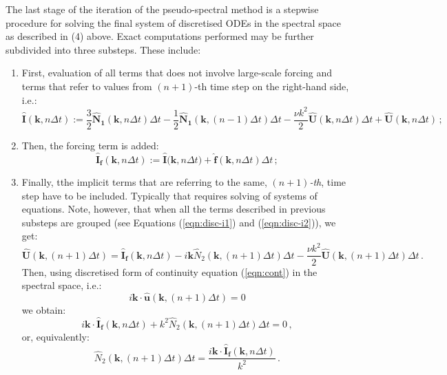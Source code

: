 \documentclass{pracamgren}
\begin{document}
The last stage of the iteration of the pseudo-spectral method is a stepwise procedure for solving the final system of discretised ODEs in the spectral space as described in (4) above.
Exact computations performed may be further subdivided into three substeps.
These include:
\begin{enumerate}
\item First, evaluation of all terms that does not involve large-scale forcing and terms that refer to values from $(n+1)$-th time step on the right-hand side, i.e.:
\begin{equation}
\label{eqn:disc-i1}
\mathbf{\hat{I}}(\mathbf{k}, n \Delta t) := \frac{3}{2} \mathbf{\hat{N}_1}(\mathbf{k}, n \Delta t) \Delta t - \frac{1}{2} \mathbf{\hat{N}_1}(\mathbf{k}, (n-1) \Delta t) \Delta t - \frac{\nu k^2}{2} \mathbf{\hat{U}}(\mathbf{k}, n \Delta t) \Delta t + \mathbf{\hat{U}}(\mathbf{k}, n \Delta t) \, ;
\end{equation}
\item Then, the forcing term is added:
\begin{equation}
\label{eqn:disc-i2}
\mathbf{\hat{I}_f}(\mathbf{k}, n \Delta t) := \mathbf{\hat{I}(\mathbf{k}}, n \Delta t) + \mathbf{\hat{f}}(\mathbf{k}, n \Delta t) \Delta t \, ;
\end{equation}
\item Finally, tthe implicit terms that are referring to the same, $(n+1)$\emph{-th}, time step have to be included.
Typically that requires solving of systems of equations.
Note, however, that when all the terms described in previous substeps are grouped (see Equations (\ref{eqn:disc-i1}) and (\ref{eqn:disc-i2})), we get:
\begin{equation}
\label{eqn:disc-i2rem}
\mathbf{\hat{U}}(\mathbf{k}, (n+1) \Delta t) = \mathbf{\hat{I}_f}(\mathbf{k}, n \Delta t) - i \mathbf{k} \hat{N}_2 (\mathbf{k}, (n+1) \Delta t) \Delta t - \frac{\nu k^2}{2} \mathbf{\hat{U}}(\mathbf{k}, (n+1) \Delta t) \Delta t \, .
\end{equation}
Then, using discretised form of continuity equation (\ref{eqn:cont}) in the spectral space, i.e.:
$$ i \mathbf{k} \cdot \mathbf{\hat{u}}(\mathbf{k}, (n+1) \Delta t) = 0 $$
we obtain:
$$ i \mathbf{k} \cdot \mathbf{\hat{I}_f}(\mathbf{k}, n \Delta t) + k^2 \hat{N}_2 (\mathbf{k}, (n+1) \Delta t) \Delta t = 0 \, , $$
or, equivalently:
\begin{equation}
\label{eqn:disc-n2}
\hat{N}_2 (\mathbf{k}, (n+1) \Delta t) \Delta t = \frac{i \mathbf{k} \cdot \mathbf{\hat{I}_f}(\mathbf{k}, n \Delta t)}{k^2} \, .
\end{equation}

\end{enumerate}
\end{document}
